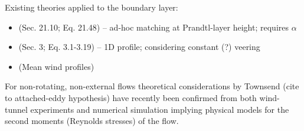 \documentclass[a4paper,11pt]{article}
\begin{document}
Existing theories applied to the boundary layer:
\begin{itemize}
\item \cite{Etling:2002kx, Emeis:2018vq}  (Sec. 21.10; Eq. 21.48) -- ad-hoc matching at Prandtl-layer height; requires $\alpha$ 
\item \cite{Emeis:2007cy} (Sec. 3; Eq. 3.1-3.19) -- 1D profile; considering constant (?) veering 
\item \cite{Gryning:2007dy} (Mean wind profiles)
\end{itemize}

For non-rotating, non-external flows theoretical considerations by Townsend (cite to attached-eddy hypothesis)
have recently been confirmed from both wind-tunnel  experiments and numerical simulation \cite{Ng:2011bk,Marusic:2013hf}
implying physical models for the second moments (Reynolds stresses) of the flow.
%
\end{document}
